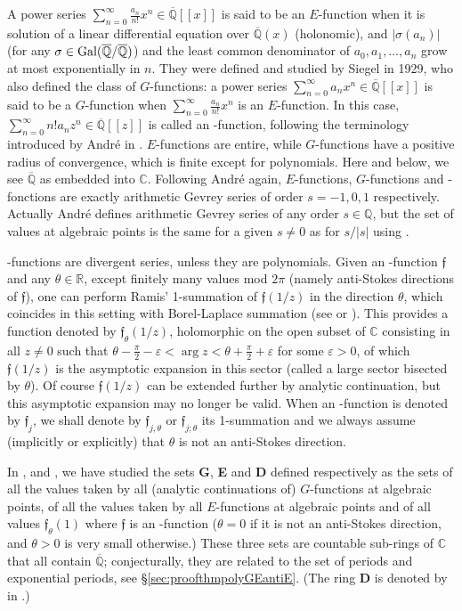 \documentclass[reqno,12pt]{article}
\numberwithin{equation}{section}
\theoremstyle{remark}
\newcommand{\Q}{\mathbb{Q}}
\newcommand{\R}{\mathbb{R}}
\renewcommand{\C}{\mathbb{C}}
\newcommand{\Qbar}{\overline{\mathbb Q}}
\newcommand{\eps}{\varepsilon}
\newcommand{\tantie}{\foreignlanguage{russian}{\CYREREV}}
\newcommand{\antie}{\text{\tantie}}
\newcommand{\fgo}{\mathfrak{f}}
\begin{document}
A power series $\sum_{n=0}^\infty \frac{a_n}{n!} x^n \in \Qbar[[x]]$ is said to be an $E$-function when it is solution of a linear differential equation over $\Qbar(x)$ (holonomic), and $\vert \sigma(a_n)\vert$ (for any $\sigma\in \textup{Gal}(\Qbar/\Qbar)$) and the least common denominator of $a_0, a_1, \ldots, a_n$ grow at most exponentially in $n$. They were defined and studied by Siegel in 1929, who also defined the class of $G$-functions: a power series $\sum_{n=0}^\infty a_n x^n \in \Qbar[[x]]$ is said to be a $G$-function when $\sum_{n=0}^\infty \frac{a_n}{n!} x^n$ is an $E$-function. In this case,  $\sum_{n=0}^\infty n!a_n z^n\in \Qbar[[z]]$  is called an \antie-function, following the terminology introduced by Andr\'e in \cite{andre}. $E$-functions are entire, while $G$-functions have a positive radius of convergence, which is finite except for polynomials. Here and below, we see $\Qbar$ as embedded into $\C$. Following André again, $E$-functions, $G$-functions and \tantie-fonctions are exactly arithmetic Gevrey series of  order $s=-1,0,1$ respectively. Actually André defines arithmetic Gevrey series of any order $s\in\Q$, but the set of values at algebraic points is the same for a given $s\neq 0$ as for $s/|s|$ using \cite[Corollaire 1.3.2]{andre}.

{\antie}-functions are divergent series, unless they are polynomials. 
Given an \antie-function $\fgo$ and any $\theta\in\R$, except finitely many values mod $2\pi$ (namely anti-Stokes directions of $\fgo$), one can perform Ramis' 1-summation of $\fgo(1/z)$ in the direction $\theta$, which coincides in this setting with Borel-Laplace summation (see \cite{Ramis} or \cite{ateo}). This provides a function denoted by $\fgo_\theta(1/z)$, holomorphic on the open subset of $\C$ consisting in all $z\neq 0$ such that $\theta-\frac\pi 2 -\eps < \arg z <  \theta+\frac\pi 2 +\eps$ for some $\eps>0$, of which $\fgo(1/z)$ is the asymptotic expansion in this sector (called a large sector bisected by $\theta$). Of course $\fgo(1/z)$ can be extended further by analytic continuation, but this asymptotic expansion may no longer be valid. When an  \antie-function  is denoted by $\fgo_j$, we shall denote by $\fgo_{j,\theta}$ or $\fgo_{j;\theta}$ its 1-summation and we always assume (implicitly or explicitly) that $\theta $ is not an anti-Stokes direction.


In \cite{gvalues}, \cite{ateo} and \cite[\S 4.3]{fuchsien}, we have studied the sets {\bf G},  {\bf E} and {\bf D} defined respectively as the sets of all the values taken  by all (analytic continuations of) $G$-functions at algebraic points, of  all the values taken by all  $E$-functions at algebraic points and  of all values 
$\fgo_\theta(1)$ where $\fgo$ is an  \antie-function ($\theta=0$ if it is not an anti-Stokes direction, and $\theta>0$ is very small otherwise.) These three sets are countable sub-rings of $\mathbb C$ that all contain $\Qbar$; conjecturally, they are related to the set of periods and exponential periods, see \S\ref{sec:proofthmpolyGEantiE}. (The ring {\bf D} is denoted by {\bf \tantie} in \cite{fuchsien}.)
\end{document}
